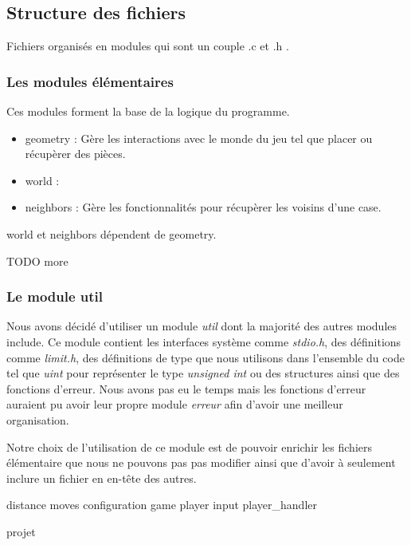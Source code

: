\subsection{Structure des fichiers}

Fichiers organisés en modules qui sont un couple .c et .h .  

\subsubsection{Les modules élémentaires}

Ces modules forment la base de la logique du programme. 

\begin{itemize}
    \item geometry : Gère les interactions avec le monde du jeu tel que placer ou récupèrer des pièces.
    \item world : 
    \item neighbors : Gère les fonctionnalités pour récupèrer les voisins d'une case.
\end{itemize}

world et neighbors dépendent de geometry.

TODO more

\subsubsection{Le module util}

Nous avons décidé d'utiliser un module \emph{util} dont la majorité des autres modules include. 
Ce module contient les interfaces système comme \emph{stdio.h}, des définitions comme \emph{limit.h},
des définitions de type que nous utilisons dans l'ensemble du code tel que \emph{uint} pour représenter
le type \emph{unsigned int} ou des structures ainsi que des fonctions d'erreur. Nous avons pas eu le temps
mais les fonctions d'erreur auraient pu avoir leur propre module \emph{erreur} afin d'avoir une meilleur organisation.

Notre choix de l'utilisation de ce module est de pouvoir enrichir les fichiers élémentaire que nous ne pouvons pas
pas modifier ainsi que d'avoir à seulement inclure un fichier en en-tête des autres.  



distance
moves
configuration
game
player
input
player\_handler

projet




